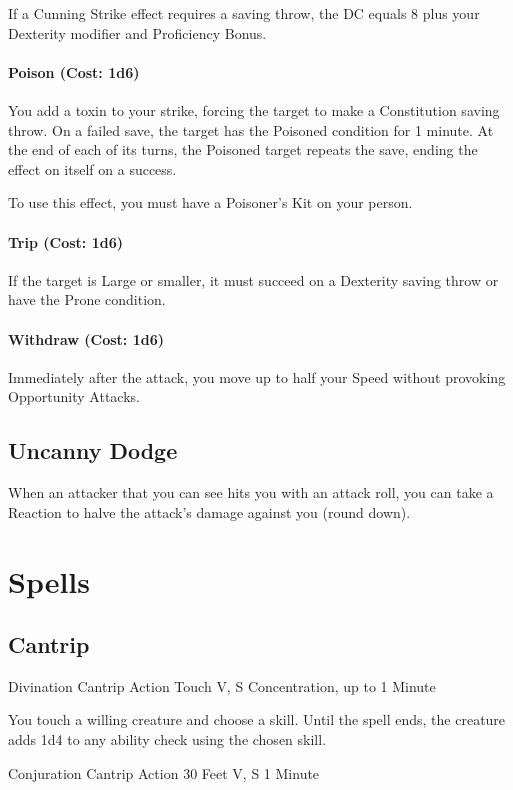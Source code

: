 \documentclass[letterpaper,openany,oneside,twocolumn]{book}
\begin{document}
If a Cunning Strike effect requires a saving throw, the DC equals 8 plus your Dexterity modifier and Proficiency Bonus.

\paragraph*{Poison (Cost: 1d6)} You add a toxin to your strike, forcing the target to make a Constitution saving throw. On a failed save, the target has the Poisoned condition for 1 minute. At the end of each of its turns, the Poisoned target repeats the save, ending the effect on itself on a success.

To use this effect, you must have a Poisoner's Kit on your person.

\paragraph*{Trip (Cost: 1d6)} If the target is Large or smaller, it must succeed on a Dexterity saving throw or have the Prone condition.

\paragraph*{Withdraw (Cost: 1d6)} Immediately after the attack, you move up to half your Speed without provoking Opportunity Attacks.
\subsection*{Uncanny Dodge}
When an attacker that you can see hits you with an attack roll, you can take a Reaction to halve the attack's damage against you (round down).

\section*{Spells}
\subsection*{Cantrip}

	{Divination Cantrip}
	{Action}
	{Touch}
	{V, S}
	{Concentration, up to 1 Minute}

You touch a willing creature and choose a skill. Until the spell ends, the creature adds 1d4 to any ability check using the chosen skill.

	{Conjuration Cantrip}
	{Action}
	{30 Feet}
	{V, S}
	{1 Minute}
\end{document}
